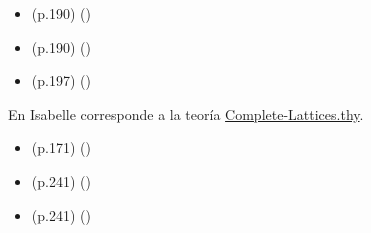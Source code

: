 \begin{isabellebody}
\begin{isamarkuptext}
\begin{itemize}
{{\isacharparenleft}{\isasymnot}\ {\isacharparenleft}{\isasymexists}x{\isasymin}A{\isachardot}\ P\ x{\isacharparenright}{\isacharparenright}\ {\isacharequal}\ {\isacharparenleft}{\isasymforall}x{\isasymin}A{\isachardot}\ {\isasymnot}\ P\ x{\isacharparenright}} 
      \hfill ()
    \item (p.190)  
      \hfill ()
    \item (p.190)  
      \hfill ()
    \item (p.197)  
      \hfill ()
  \end{itemize}%
\end{isamarkuptext}\isamarkuptrue%
%
\isadelimdocument
%
\endisadelimdocument
%
\isatagdocument
%
\isamarkuptrue%
%
\endisatagdocument
{\isafolddocument}%
%
\isadelimdocument
%
\endisadelimdocument
%
\begin{isamarkuptext}%
En Isabelle corresponde a la teoría 
  \href{https://acortar.link/iMt7h}{Complete-Lattices.thy}.%
\end{isamarkuptext}\isamarkuptrue%
%
\begin{isamarkuptext}%
\begin{itemize}
    \item (p.171)  
      \hfill ()
    \item (p.241)  
      \hfill ()
    \item (p.241)  
      \hfill ()

\end{itemize}
\end{isamarkuptext}
\end{isabellebody}
